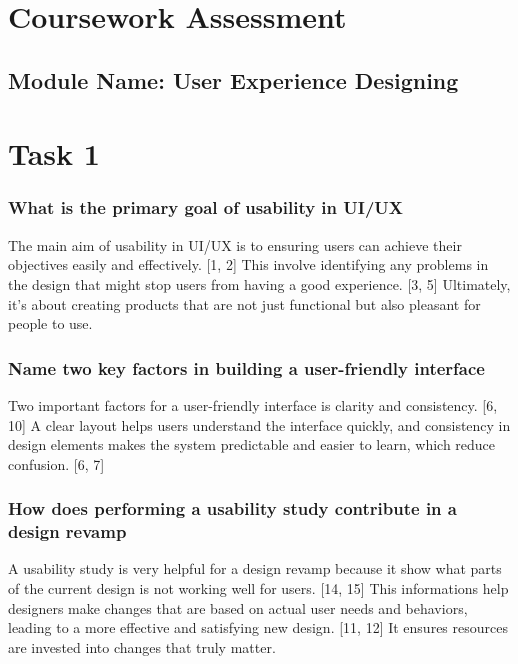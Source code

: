 \documentclass[12pt,a4paper]{article}
\begin{document}
\newpage
{} %


\section*{Coursework Assessment}
\renewcommand{\labelitemi}{--} %

\subsection*{Module Name: User Experience Designing}

\vspace{1cm}

\section*{Task 1}

\subsubsection*{What is the primary goal of usability in UI/UX}
The main aim of usability in UI/UX is to ensuring users can achieve their objectives easily and effectively. [1, 2] This involve identifying any problems in the design that might stop users from having a good experience. [3, 5] Ultimately, it’s about creating products that are not just functional but also pleasant for people to use.

\subsubsection*{Name two key factors in building a user-friendly interface}
Two important factors for a user-friendly interface is clarity and consistency. [6, 10] A clear layout helps users understand the interface quickly, and consistency in design elements makes the system predictable and easier to learn, which reduce confusion. [6, 7]

\subsubsection*{How does performing a usability study contribute in a design revamp}
A usability study is very helpful for a design revamp because it show what parts of the current design is not working well for users. [14, 15] This informations help designers make changes that are based on actual user needs and behaviors, leading to a more effective and satisfying new design. [11, 12] It ensures resources are invested into changes that truly matter.
\end{document}

